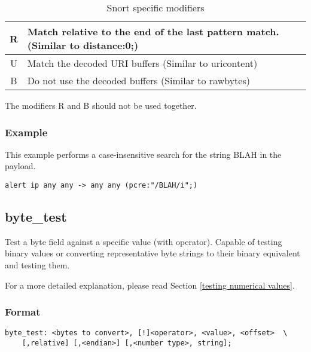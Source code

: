 \documentclass[english]{report}
\begin{document}
\begin{longtable}{|c|p{3.5in}|}
\caption{Snort specific modifiers} \\
\hline
R & Match relative to the end of the last pattern match.  (Similar to distance:0;) \\
\hline
U & Match the decoded URI buffers (Similar to uricontent) \\
\hline
B & Do not use the decoded buffers (Similar to rawbytes) \\
\hline
\end{longtable}

The modifiers R and B should not be used together.

\subsubsection{Example}

This example performs a case-insensitive search for the string BLAH in the payload.

\begin{verbatim}
alert ip any any -> any any (pcre:"/BLAH/i";)
\end{verbatim}


\subsection{byte\_test\label{sub:byte_test}}

Test a byte field against a specific value (with operator).  Capable
 of testing binary values or converting representative byte strings to
their binary equivalent and testing them.

For a more detailed explanation, please read Section \ref{testing numerical values}.

\subsubsection{Format}

\begin{verbatim}
byte_test: <bytes to convert>, [!]<operator>, <value>, <offset>  \
    [,relative] [,<endian>] [,<number type>, string];
\end{verbatim}
			
\end{document}
